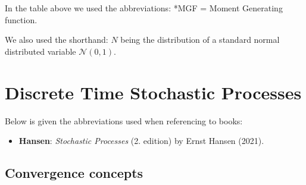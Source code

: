 \documentclass[a4paper,10pt,openany]{book}
\providecommand{\tightlist}{%
 \setlength{\itemsep}{0pt}\setlength{\parskip}{0pt}}
\begin{document}
In the table above we used the abbreviations: *MGF = Moment Generating function.

We also used the shorthand: \(N\) being the distribution of a standard normal distributed variable \(\mathcal{N}(0,1)\).

\hypertarget{discrete-time-stochastic-processes}{%
\chapter{Discrete Time Stochastic Processes}\label{discrete-time-stochastic-processes}}

Below is given the abbreviations used when referencing to books:

\begin{itemize}
\tightlist
\item
  \textbf{Hansen}: \emph{Stochastic Processes} (2. edition) by Ernst Hansen (2021).\cite{hansen2021}
\end{itemize}

\hypertarget{convergence-concepts}{%
\section{Convergence concepts}\label{convergence-concepts}}
\end{document}
